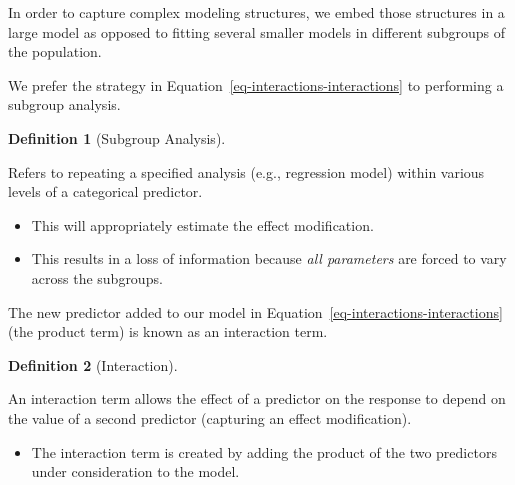 \documentclass[
  letterpaper,
  DIV=11,
  numbers=noendperiod]{scrreprt}
\providecommand{\tightlist}{%
  \setlength{\itemsep}{0pt}\setlength{\parskip}{0pt}}\usepackage{longtable,booktabs,array}
\theoremstyle{definition}
\theoremstyle{definition}
\newtheorem{definition}{Definition}[chapter]
\theoremstyle{remark}
\begin{document}
\begin{tcolorbox}[enhanced jigsaw, bottomrule=.15mm, titlerule=0mm, bottomtitle=1mm, colback=white, coltitle=black, rightrule=.15mm, leftrule=.75mm, toprule=.15mm, toptitle=1mm, left=2mm, opacityback=0, colframe=quarto-callout-tip-color-frame, breakable, title=\textcolor{quarto-callout-tip-color}{\faLightbulb}\hspace{0.5em}{Big Idea}, arc=.35mm, colbacktitle=quarto-callout-tip-color!10!white, opacitybacktitle=0.6]

In order to capture complex modeling structures, we embed those
structures in a large model as opposed to fitting several smaller models
in different subgroups of the population.

\end{tcolorbox}

We prefer the strategy in Equation~\ref{eq-interactions-interactions} to
performing a subgroup analysis.

\begin{definition}[Subgroup
Analysis]\protect\hypertarget{def-subgroup-analysis}{}\label{def-subgroup-analysis}

Refers to repeating a specified analysis (e.g., regression model) within
various levels of a categorical predictor.

\begin{itemize}
\tightlist
\item
  This will appropriately estimate the effect modification.
\item
  This results in a loss of information because \emph{all parameters}
  are forced to vary across the subgroups.
\end{itemize}

\end{definition}

The new predictor added to our model in
Equation~\ref{eq-interactions-interactions} (the product term) is known
as an interaction term.

\begin{definition}[Interaction]\protect\hypertarget{def-interaction}{}\label{def-interaction}

An interaction term allows the effect of a predictor on the response to
depend on the value of a second predictor (capturing an effect
modification).

\begin{itemize}
\tightlist
\item
  The interaction term is created by adding the product of the two
  predictors under consideration to the model.
\end{itemize}

\end{definition}
\end{document}
